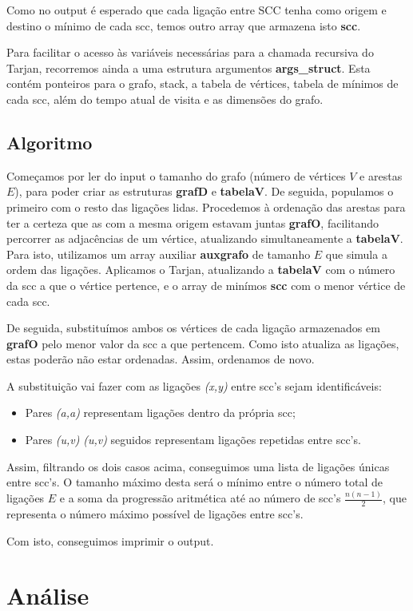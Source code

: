 \documentclass[12pt,a4paper]{article}
\begin{document}
Como no output é esperado que cada ligação entre SCC tenha como origem e destino o mínimo de cada scc, temos outro array que armazena isto \textbf{scc}.

Para facilitar o acesso às variáveis necessárias para a chamada recursiva do Tarjan, recorremos ainda a uma estrutura argumentos \textbf{args\_struct}. Esta contém ponteiros para o grafo, stack, a tabela de vértices, tabela de mínimos de cada scc, além do tempo atual de visita e as dimensões do grafo.
\subsection{Algoritmo}
Começamos por ler do input o tamanho do grafo (número de vértices $V$ e arestas $E$), para poder criar as estruturas \textbf{grafD} e \textbf{tabelaV}. De seguida, populamos o primeiro com o resto das ligações lidas.
Procedemos à ordenação das arestas para ter a certeza que as com a mesma origem estavam juntas \textbf{grafO}, facilitando percorrer as adjacências de um vértice, atualizando simultaneamente a \textbf{tabelaV}.
Para isto, utilizamos um array auxiliar \textbf{auxgrafo} de tamanho $E$ que simula a ordem das ligações.
Aplicamos o Tarjan, atualizando a \textbf{tabelaV} com o número da scc a que o vértice pertence, e o array de minímos \textbf{scc} com o menor vértice de cada scc.

De seguida, substituímos ambos os vértices de cada ligação armazenados em \textbf{grafO} pelo menor valor da scc a que pertencem.
Como isto atualiza as ligações, estas poderão não estar ordenadas. Assim, ordenamos de novo.

A substituição vai fazer com as ligações \textit{(x,y)} entre scc's sejam identificáveis:
\begin{itemize}
	\item Pares \textit{(a,a)} representam ligações dentro da própria scc;
	\item Pares \textit{(u,v)} \textit{(u,v)} seguidos representam ligações repetidas entre scc's.
\end{itemize}
Assim, filtrando os dois casos acima, conseguimos uma lista de ligações únicas entre scc's.
O tamanho máximo desta será o mínimo entre o número total de ligações $E$ e a soma da progressão aritmética até ao número de scc's $\frac{n(n-1)}{2}$,
que representa o número máximo possível de ligações entre scc's.

Com isto, conseguimos imprimir o output.
\section{Análise}
\end{document}
